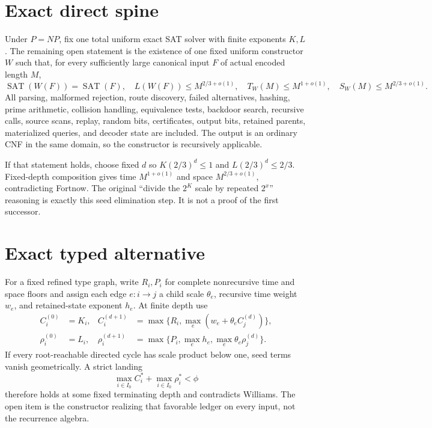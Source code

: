 \documentclass[11pt]{article}
\begin{document}
\section{Exact direct spine}

Under $P=NP$, fix one total uniform exact SAT solver with finite exponents
$K,L$.  The remaining open statement is the existence of one fixed uniform
constructor $W$ such that, for every sufficiently large canonical input
$F$ of actual encoded length $M$,
\[
 \operatorname{SAT}(W(F))=\operatorname{SAT}(F),\quad
 L(W(F))\le M^{2/3+o(1)},\quad
 T_W(M)\le M^{1+o(1)},\quad
 S_W(M)\le M^{2/3+o(1)}.
\]
All parsing, malformed rejection, route discovery, failed alternatives,
hashing, prime arithmetic, collision handling, equivalence tests, backdoor
search, recursive calls, source scans, replay, random bits, certificates,
output bits, retained parents, materialized queries, and decoder state are
included.  The output is an ordinary CNF in the same domain, so the
constructor is recursively applicable.

If that statement holds, choose fixed $d$ so
$K(2/3)^d\le1$ and $L(2/3)^d\le2/3$.  Fixed-depth composition gives time
$M^{1+o(1)}$ and space $M^{2/3+o(1)}$, contradicting Fortnow.  The original
``divide the $2^K$ scale by repeated $2^x$'' reasoning is exactly this seed
elimination step.  It is not a proof of the first successor.

\section{Exact typed alternative}

For a fixed refined type graph, write $R_i,P_i$ for complete nonrecursive
time and space floors and assign each edge $e:i\to j$ a child scale
$\theta_e$, recursive time weight $w_e$, and retained-state exponent $h_e$.
At finite depth use
\begin{align*}
 C_i^{(0)}&=K_i,&
 C_i^{(d+1)}&=\max\{R_i,\max_e(w_e+\theta_e C_j^{(d)})\},\\
 \rho_i^{(0)}&=L_i,&
 \rho_i^{(d+1)}&=\max\{P_i,\max_e h_e,
                         \max_e\theta_e\rho_j^{(d)}\}.
\end{align*}
If every root-reachable directed cycle has scale product below one, seed
terms vanish geometrically.  A strict landing
\[
 \max_{i\in I_0}C_i^*+\max_{i\in I_0}\rho_i^*<\phi
\]
therefore holds at some fixed terminating depth and contradicts Williams.
The open item is the constructor realizing that favorable ledger on every
input, not the recurrence algebra.
\end{document}
